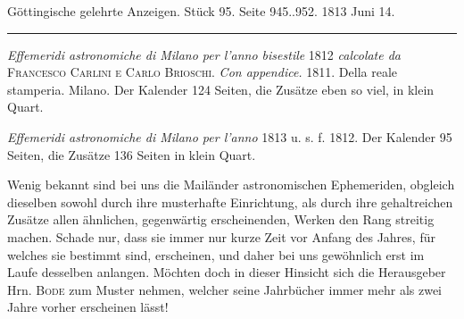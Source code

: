 \clearpage
{}
\begin{center}\small Göttingische gelehrte Anzeigen. Stück 95. Seite 945..952. 1813 Juni 14.\\[3pt]\rule{.72\linewidth}{.3pt}\end{center}

\emph{Effemeridi astronomiche di Milano per l'anno bisestile} 1812 \emph{calcolate da} \textsc{Francesco Carlini e Carlo Brioschi}. \emph{Con appendice.} 1811. Della reale stamperia. Milano. Der Kalender 124 Seiten, die Zusätze eben so viel, in klein Quart.

\emph{Effemeridi astronomiche di Milano per l'anno} 1813 u. s. f. 1812. Der Kalender 95 Seiten, die Zusätze 136 Seiten in klein Quart.

Wenig bekannt sind bei uns die Mailänder astronomischen Ephemeriden, obgleich dieselben sowohl durch ihre musterhafte Einrichtung, als durch ihre gehaltreichen Zusätze allen ähnlichen, gegenwärtig erscheinenden, Werken den Rang streitig machen. Schade nur, dass sie immer nur kurze Zeit vor Anfang des Jahres, für welches sie bestimmt sind, erscheinen, und daher bei uns gewöhnlich erst im Laufe desselben anlangen. Möchten doch in dieser Hinsicht sich die Herausgeber Hrn. \textsc{Bode} zum Muster nehmen, welcher seine Jahrbücher immer mehr als zwei Jahre vorher erscheinen lässt!

